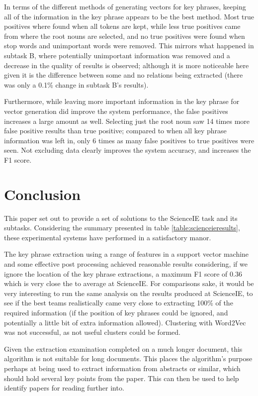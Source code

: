 In terms of the different methods of generating vectors for key phrases, keeping all of the information in the key phrase appears to be the best method. Most true positives where found when all tokens are kept, while less true positives came from where the root nouns are selected, and no true positives were found when stop words and unimportant words were removed. This mirrors what happened in subtask B, where potentially unimportant information was removed and a decrease in the quality of results is observed; although it is more noticeable here given it is the difference between some and no relations being extracted (there was only a 0.1\% change in subtask B's results).

Furthermore, while leaving more important information in the key phrase for vector generation did improve the system performance, the false positives increases a large amount as well. Selecting just the root noun saw 14 times more false positive results than true positive; compared to when all key phrase information was left in, only 6 times as many false positives to true positives were seen. Not excluding data clearly improves the system accuracy, and increases the F1 score.

\section{Conclusion}
This paper set out to provide a set of solutions to the ScienceIE task and its subtasks. Considering the summary presented in table \ref{table:scienceieresults}, these experimental systems have performed in a satisfactory manor. 

The key phrase extraction using a range of features in a support vector machine and some effective post processing achieved reasonable results considering, if we ignore the location of the key phrase extractions, a maximum F1 score of 0.36 which is very close the to average at ScienceIE. For comparisons sake, it would be very interesting to run the same analysis on the results produced at ScienceIE, to see if the best teams realistically came very close to extracting 100\% of the required information (if the position of key phrases could be ignored, and potentially a little bit of extra information allowed). Clustering with Word2Vec was not successful, as not useful clusters could be formed. 

Given the extraction examination completed on a much longer document, this algorithm is not suitable for long documents. This places the algorithm's purpose perhaps at being used to extract information from abstracts or similar, which should hold several key points from the paper. This can then be used to help identify papers for reading further into.

